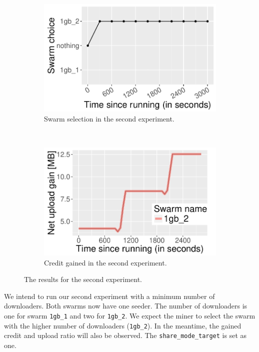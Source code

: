 \begin{figure}[h]
	\begin{subfigure}[t]{0.5\textwidth}
		\centering
		\includegraphics[width=\textwidth]{pics/results/valgain0.pdf}
		\caption{Swarm selection in the second experiment.}
		\label{fig:val0gain}
	\end{subfigure}
	~
	\begin{subfigure}[t]{0.5\textwidth}
		\centering
		\includegraphics[width=\textwidth]{pics/results/valgain.pdf}
		\caption{Credit gained in the second experiment.}
		\label{fig:vgain}
	\end{subfigure}
	\caption{The results for the second experiment.}
\end{figure}

We intend to run our second experiment with a minimum number of downloaders. Both swarms now have one seeder. The number of downloaders is one for swarm \texttt{1gb\_1} and two  for \texttt{1gb\_2}. We expect the miner to select the swarm with the higher number of downloaders (\texttt{1gb\_2}). In the meantime, the  gained credit and upload ratio will also be observed. The \texttt{share\_mode\_target} is set as one.

